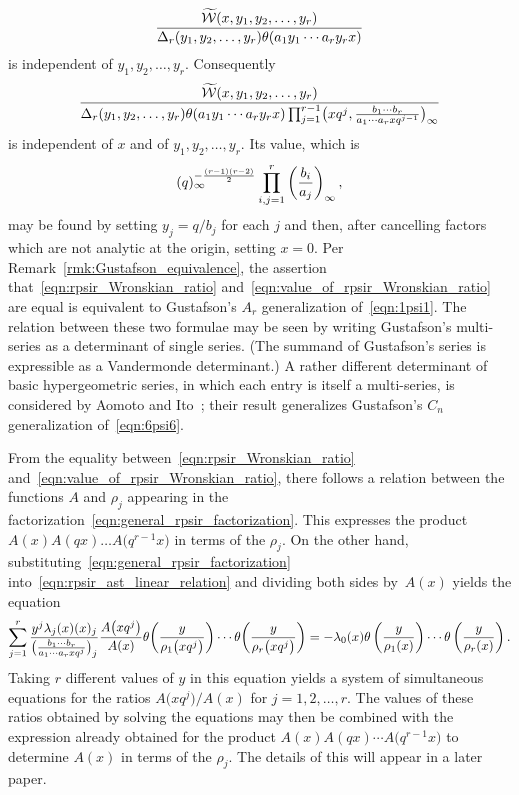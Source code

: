 \documentclass[10pt,a4paper]{amsart}
\numberwithin{equation}{section}
\begin{document}
\[ {\widetilde{\mathcal{W}}(x,y_1,y_2,\dots,y_r) \over \Delta_r(y_1,y_2,\dots,y_r) \theta(a_1y_1\cdots a_ry_r x)} \]
is independent of $y_1,y_2,\dots,y_r$. Consequently
\begin{equation} \label{eqn:rpsir_Wronskian_ratio}
{\widetilde{\mathcal{W}}(x,y_1,y_2,\dots,y_r) \over \Delta_r(y_1,y_2,\dots,y_r) \theta(a_1y_1\cdots a_ry_r x)\prod_{j=1}^{r-1} \bigl(xq^j,{b_1\cdots b_r \over a_1\cdots a_r x q^{j-1}}\bigr)_\infty}
\end{equation}
is independent of $x$ and of $y_1,y_2,\dots,y_r$. Its value, which is
\begin{equation} \label{eqn:value_of_rpsir_Wronskian_ratio}
(q)_\infty^{-{(r-1)(r-2) \over 2}} \prod_{i,j=1}^r \left({b_i \over a_j}\right)_{ \infty},
\end{equation}
may be found by setting $y_j = q/b_j$ for each $j$ and then, after cancelling factors which are not analytic at the origin, setting $x=0$. Per Remark~\ref{rmk:Gustafson_equivalence}, the assertion that~\eqref{eqn:rpsir_Wronskian_ratio} and~\eqref{eqn:value_of_rpsir_Wronskian_ratio} are equal is equivalent to Gustafson's $A_r$ generalization of~\eqref{eqn:1psi1}. The relation between these two formulae may be seen by writing Gustafson's multi-series as a determinant of single series. (The summand of Gustafson's series is expressible as a Vandermonde determinant.) A rather different determinant of basic hypergeometric series, in which each entry is itself a multi-series, is considered by Aomoto and Ito~\cite[Theorem~3.9]{Aomoto2008}; their result generalizes Gustafson's $C_n$ generalization of~\eqref{eqn:6psi6}.

From the equality between~\eqref{eqn:rpsir_Wronskian_ratio} and~\eqref{eqn:value_of_rpsir_Wronskian_ratio}, there follows a relation between the functions $A$ and $\rho_j$ appearing in the factorization~\eqref{eqn:general_rpsir_factorization}. This expresses the product $A(x)A(qx) \dots A\bigl(q^{r-1}x\bigr)$ in terms of the $\rho_j$. On the other hand, substituting~\eqref{eqn:general_rpsir_factorization} into~\eqref{eqn:rpsir_ast_linear_relation} and dividing both sides by~$A(x)$ yields the equation
\[ \sum_{j=1}^r {y^j \lambda_j(x) (x)_j \over \bigl({b_1\cdots b_r \over a_1\cdots a_r xq^j}\bigr)_j} {A\bigl(xq^j\bigr) \over A(x)} \theta\bigg( {y \over \rho_1\bigl(xq^j\bigr)} \bigg) \cdots \theta\bigg( {y \over \rho_r\bigl(xq^j\bigr)} \bigg) = - \lambda_0(x) \theta\left( {y \over \rho_1(x)} \right) \cdots \theta\left( {y \over \rho_r(x)} \right). \]
Taking $r$ different values of $y$ in this equation yields a system of simultaneous equations for the ratios $A\bigl(xq^j\bigr)/A(x)$ for $j=1,2,\dots,r$. The values of these ratios obtained by solving the equations may then be combined with the expression already obtained for the product $A(x)A(qx) \cdots A\bigl(q^{r-1}x\bigr)$ to determine $A(x)$ in terms of the $\rho_j$. The details of this will appear in a later paper.
\end{document}
